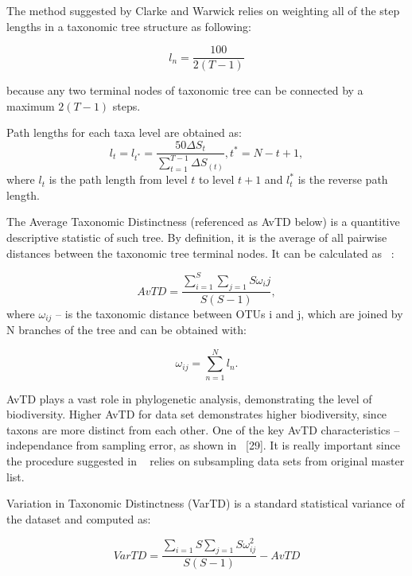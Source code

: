 \documentclass[a4paper,11pt]{article}
\begin{document}
The method suggested by Clarke and Warwick relies on weighting all of the step lengths in a taxonomic tree structure as following:

\begin{equation*}
l_{n}=\frac{100}{2(T-1)}
\end{equation*}

because any two terminal nodes of taxonomic tree can be connected by a maximum $2(T-1)$ steps.

Path lengths for each taxa level are obtained as:
\begin{equation*}
l_{t}=l_{t^{*}}=\frac{50\Delta S_{t}}{\sum_{t=1}^{T-1}\Delta S_{(t)}},t^{*}=N-t+1,
\end{equation*}
where $l_t$ is the path length from level $t$ to level $t+1$ and $l_t^{*}$ is the reverse path length.

The Average Taxonomic Distinctness (referenced as AvTD below) is a quantitive descriptive statistic of such tree. By definition, it is the average of all pairwise distances between the taxonomic tree terminal nodes. It can be calculated as ~\cite{dowell2005molecular}:

\begin{equation*}
AvTD=\frac{\sum_{i=1}^{S}\sum_{j=1}{S}\omega_ij}{S(S-1)},
\end{equation*}
where $\omega_{ij}$ -- is the taxonomic distance between OTUs i and j, which are joined by N branches of the tree and can be obtained with:

\begin{equation*}
\omega_{ij}=\sum_{n=1}^{N}l_{n}.
\end{equation*}

AvTD plays a vast role in phylogenetic analysis, demonstrating the level of biodiversity. Higher AvTD for data set demonstrates higher biodiversity, since taxons are more distinct from each other. One of the key AvTD characteristics -- independance from sampling error, as shown in ~\cite{voet1999fundamentals}[29]. It is really important since the procedure suggested in ~\cite{dowell2005molecular} relies on subsampling data sets from original master list.

Variation in Taxonomic Distinctness (VarTD) is a standard statistical variance of the dataset and computed as:

\begin{equation*}
VarTD=\frac{\sum_{i=1}{S}\sum_{j=1}{S}\omega_{ij}^{2}}{S(S-1)}-AvTD
\end{equation*}
\end{document}
